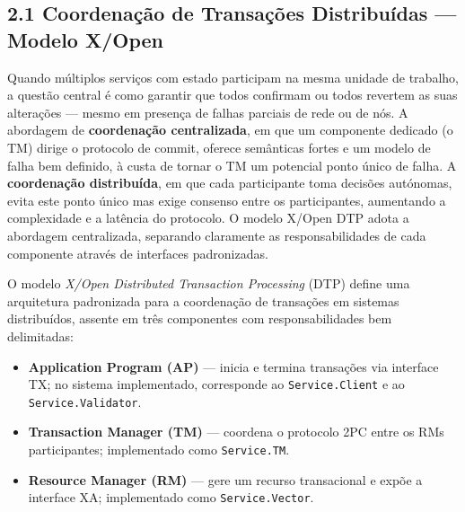 
\subsection*{2.1 Coordenação de Transações Distribuídas — Modelo X/Open}

Quando múltiplos serviços com estado participam na mesma unidade de trabalho, a questão central
é como garantir que todos confirmam ou todos revertem as suas alterações --- mesmo em presença de
falhas parciais de rede ou de nós. A abordagem de \textbf{coordenação centralizada}, em que um
componente dedicado (o TM) dirige o protocolo de commit, oferece semânticas fortes e um modelo
de falha bem definido, à custa de tornar o TM um potencial ponto único de falha. A
\textbf{coordenação distribuída}, em que cada participante toma decisões autónomas, evita este
ponto único mas exige consenso entre os participantes, aumentando a complexidade e a latência
do protocolo. O modelo X/Open DTP adota a abordagem centralizada, separando claramente as
responsabilidades de cada componente através de interfaces padronizadas.

O modelo \textit{X/Open Distributed Transaction Processing} (DTP) define uma arquitetura
padronizada para a coordenação de transações em sistemas distribuídos, assente em três
componentes com responsabilidades bem delimitadas:

\begin{itemize}
  \item \textbf{Application Program (AP)} --- inicia e termina transações via interface TX;
        no sistema implementado, corresponde ao \texttt{Service.Client} e ao \texttt{Service.Validator}.
  \item \textbf{Transaction Manager (TM)} --- coordena o protocolo 2PC entre os RMs participantes;
        implementado como \texttt{Service.TM}.
  \item \textbf{Resource Manager (RM)} --- gere um recurso transacional e expõe a interface XA;
        implementado como \texttt{Service.Vector}.
\end{itemize}

